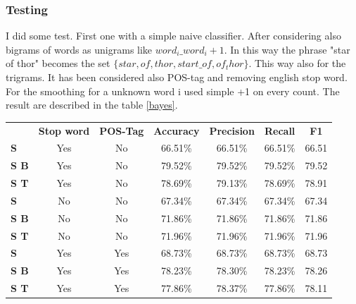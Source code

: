 \documentclass[a4paper,8pt,oneside]{article}
\begin{document}
		\subsubsection{Testing}
			I did some test. First one with a simple naive classifier. After considering also bigrams of words as unigrams like $word_i\_word_i+1$. In this way the phrase "star of thor" becomes the set $\{star,of,thor,start\_of,of_thor\}$. This way also for the trigrams. It has been considered also POS-tag and removing english stop word. For the smoothing for a unknown word i used simple +1 on every count.
			The result are described in the table \ref{bayes}.
			\begin{table}[h]
			\begin{tabular}{lcccccc}
			                              & \textbf{Stop word} & \textbf{POS-Tag} & \textbf{Accuracy} & \textbf{Precision} & \textbf{Recall} & \textbf{F1} \\
			\textbf{S}               & Yes                & No               & 66.51\%           & 66.51\%            & 66.51\%         & 66.51             \\
			\cellcolor[HTML]{34FF34}\textbf{S B}  & \cellcolor[HTML]{34FF34}Yes                & \cellcolor[HTML]{34FF34}No               & \cellcolor[HTML]{34FF34}79.52\%           & \cellcolor[HTML]{34FF34}79.52\%            & \cellcolor[HTML]{34FF34}79.52\%         & \cellcolor[HTML]{34FF34}79.52             \\
			\textbf{S T} & Yes                & No               & 78.69\%           & 79.13\%            & 78.69\%         & 78.91             \\
			\textbf{S}               & No                 & No               & 67.34\%           & 67.34\%            & 67.34\%         & 67.34             \\
			\textbf{S B}  & No                 & No               & 71.86\%           & 71.86\%            & 71.86\%         & 71.86             \\
			\textbf{S T} & No                 & No               & 71.96\%           & 71.96\%            & 71.96\%         & 71.96             \\
			\textbf{S}               & Yes                & Yes              & 68.73\%           & 68.73\%            & 68.73\%         & 68.73             \\
			\textbf{S B}  & Yes                & Yes              & 78.23\%           & 78.30\%            & 78.23\%         & 78.26             \\
			\textbf{S T} & Yes                & Yes              & 77.86\%           & 78.37\%            & 77.86\%         & 78.11             \\

\end{tabular}
\end{table}
\end{document}
